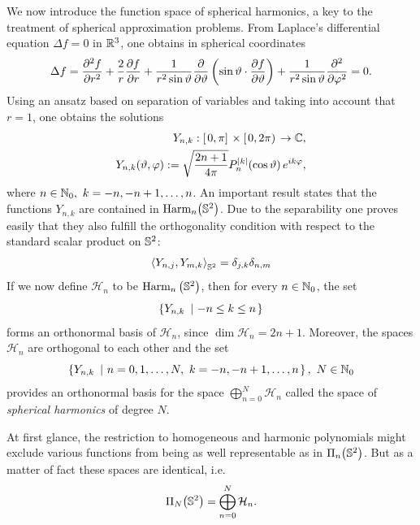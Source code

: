 We now introduce the function space of spherical harmonics, a key to the treatment of spherical approximation problems.
From Laplace's differential equation $\Delta f = 0$ in $\mathbb{R}^3$, one obtains in spherical coordinates
\begin{equation}
  \label{SphericalHarmonics.LaplaceEquation.SphericalCoordinates}
  \Delta f = \frac{\partial^2 f}{\partial r^2} + \frac{2}{r}\frac{\partial f}{\partial
  r} + \frac{1}{r^2 \sin \vartheta}\frac{\partial}{\partial \vartheta}\left(\sin \vartheta \cdot \frac{\partial f}{\partial
  \vartheta}\right) + \frac{1}{r^2 \sin \vartheta}\frac{\partial^2}{\partial \varphi^2} = 0.
\end{equation}
Using an ansatz based on separation of variables and taking into account that $r = 1$, one obtains the solutions
\begin{equation}
  \label{LegendreFunctionsAndSphericalHarmonics.SphericalHarmonics}
  \begin{split}
    Y_{n,k}: \left[\left.0,\pi\right]\right.\times\left[\left.0,2\pi\right)\right. \rightarrow
    \mathbb{C},\\
    Y_{n,k}{\hspace{-0.4ex}}\left(\vartheta,\varphi\right) := \sqrt{\frac{2n+1}{4\pi}} 
    P_{n}^{\left\vert k\right\vert}{\hspace{-0.4ex}}\left(\cos \vartheta\right) e^{ik\varphi},
  \end{split}
\end{equation}
where $n \in \mathbb{N}_{0},\ k = -n,-n+1,\dots,n$.
An important result states that the functions $Y_{n,k}$ are contained in $\text{Harm}_n{\hspace{-0.4ex}}\left(\mathbb{S}^2\right)$.
Due to the separability one proves easily
that they also fulfill the orthogonality condition with respect to the standard scalar product on $\mathbb{S}^2$:
\begin{equation}
\label{LengendreFunctionsAndSphericalHarmonics.SphericalHarmonics.Orthogonality1}
\left<Y_{n,j},Y_{m,k}\right>_{\mathbb{S}^2} = \delta_{j,k} \delta_{n,m}\end{equation}
If we now define $\mathcal{H}_n$ to be
$\text{Harm}_n\left(\mathbb{S}^2\right)$, then
for every $n \in \mathbb{N}_0$, the set
\begin{equation}
  \nonumber
  \left\{Y_{n,k}\ \left|\ -n \le k \le n\right.\right\rbrace
\end{equation}
forms an orthonormal basis of $\mathcal{H}_n$, since $\dim \mathcal{H}_n =
2n+1$. Moreover, the spaces $\mathcal{H}_n$ are orthogonal
to each other and the set 
$$\left\{Y_{n,k}\ \left|\ n = 0,1,\dots,N,\ k = -n,-n+1,\dots,n\right.\right\rbrace,\ N \in
\mathbb{N}_0$$ provides an orthonormal basis for the space
$\bigoplus_{n=0}^{N}\mathcal{H}_n$ called
the space of \emph{spherical harmonics} of degree $N$.

At first glance, the restriction to homogeneous and harmonic polynomials
might exclude various functions from being as well representable
as in $\Pi_n{\hspace{-0.4ex}}\left(\mathbb{S}^2\right)$. But as a matter of fact these
spaces are identical, i.e. 
\begin{equation}
  \nonumber
    \Pi_N{\hspace{-0.4ex}}\left(\mathbb{S}^2\right) = \bigoplus_{n=0}^{N}\mathcal{H}_n.
\end{equation}

